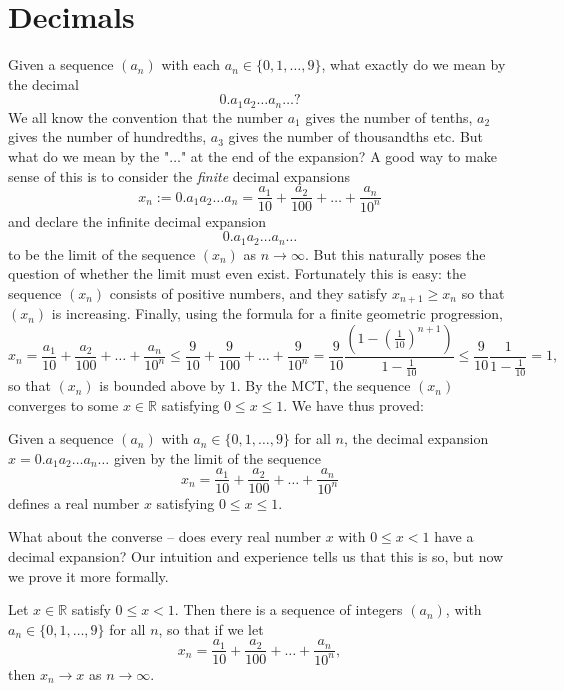 \documentclass[11pt,dvipsnames]{book}
\def\R{\mathbb{R}}
\numberwithin{figure}{section} %
\numberwithin{table}{section} %
\begin{document}
\section{Decimals}
Given a sequence $(a_n)$ with each $a_n \in \{0, 1, \dots , 9\}$, what exactly do we mean by the decimal
\[ 0.a_1 a_2 \dots a_n \dots?\]
We all know the convention that the number $a_1$ gives the number of tenths, $a_2$ gives the number of hundredths,
$a_3$ gives the number of thousandths etc. But what do we mean by the "$\dots$" at the end of the expansion? A good way to make sense of this is to consider the {\em finite} decimal expansions
\[ x_n := 0.a_1 a_2 \dots a_n = \frac{a_1}{10} + \frac{a_2}{100} + \dots + \frac{a_n}{10^n}\]
and declare the infinite decimal expansion
\[ 0.a_1 a_2 \dots a_n \dots\]
to be the limit of the sequence $(x_n)$ as $n \to \infty$. But this naturally poses the question of whether the limit must even exist. Fortunately this is easy: the sequence
$(x_n)$ consists of positive numbers, and they satisfy $x_{n+1} \geq x_n$ so that $(x_n)$ is increasing. Finally, using the formula for a finite geometric progression,
\[ x_n = \frac{a_1}{10} + \frac{a_2}{100} + \dots + \frac{a_n}{10^n} \leq \frac{9}{10} + \frac{9}{100} + \dots + \frac{9}{10^n} =  \frac{9}{10}\frac{(1 - (\frac{1}{10})^{n+1})}{1 - \frac{1}{10}} \leq \frac{9}{10}\frac{1}{1 - \frac{1}{10}}=1,\]
so that $(x_n)$ is bounded above by $1$. By the MCT, the sequence $(x_n)$ converges to some $x \in \R$ satisfying $0 \leq x \leq 1$.
We have thus proved:
\begin{theorem}
Given a sequence $(a_n)$ with $a_n \in \{0,1, \dots ,9\}$ for all $n$, the decimal expansion $ x= 0.a_1 a_2 \dots a_n \dots$ given by the limit of the sequence
\[ x_n = \frac{a_1}{10} + \frac{a_2}{100} + \dots + \frac{a_n}{10^n} \]
defines a real number $x$ satisfying $0 \leq x \leq 1$.
\end{theorem}
What about the converse -- does every real number $x$ with $0 \leq x <1$ have a decimal expansion? Our intuition and experience tells us that this is so, but now we prove it more formally.

\begin{theorem}\label{decimal_existence}
Let $x\in\mathbb{R}$ satisfy $0 \leq x <1$. Then there is a sequence of integers $(a_n)$, with $a_{n}\in \{0,1,\dots,9\}$ for all $n$, so that if we let
\[ x_n = \frac{a_1}{10} + \frac{a_2}{100} + \dots + \frac{a_n}{10^n},\]
then $x_n \to x$ as $n \to \infty$.
\end{theorem}
\end{document}
